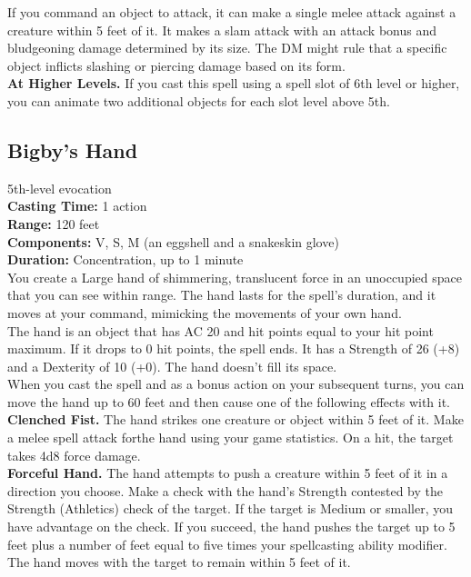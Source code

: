 \documentclass[11pt, A4paper, english]{article}
\begin{document}
If you command an object to attack, it can make a single melee attack against a creature within 5 feet of it. It makes a slam attack with an attack bonus and bludgeoning damage determined by its size. The DM might rule that a specific object inflicts slashing or piercing damage based on its form. \\
\textbf{At Higher Levels.} If you cast this spell using a spell slot of 6th level or higher, you can animate two additional objects for each slot level above 5th.

		\subsection{Bigby's Hand}
5th-level evocation \\
\textbf{Casting Time:} 1 action \\
\textbf{Range:} 120 feet \\
\textbf{Components:} V, S, M (an eggshell and a snakeskin glove) \\
\textbf{Duration:} Concentration, up to 1 minute \\
You create a Large hand of shimmering, translucent force in an unoccupied space that you can see within range. The hand lasts for the spell’s duration, and it moves at your command, mimicking the movements of your own hand. \\
The hand is an object that has AC 20 and hit points equal to your hit point maximum. If it drops to 0 hit points, the spell ends. It has a Strength of 26 (+8) and a Dexterity of 10 (+0). The hand doesn’t fill its space. \\
When you cast the spell and as a bonus action on your subsequent turns, you can move the hand up to 60 feet and then cause one of the following effects with it. \\
\textbf{Clenched Fist.} The hand strikes one creature or object within 5 feet of it. Make a melee spell attack forthe hand using your game statistics. On a hit, the target takes 4d8 force damage. \\
\textbf{Forceful Hand.} The hand attempts to push a creature within 5 feet of it in a direction you choose. Make a check with the hand’s Strength contested by the Strength (Athletics) check of the target. If the target is Medium or smaller, you have advantage on the check. If you succeed, the hand pushes the target up to 5 feet plus a number of feet equal to five times your spellcasting ability modifier. The hand moves with the target to remain within 5 feet of it. \\
\end{document}
